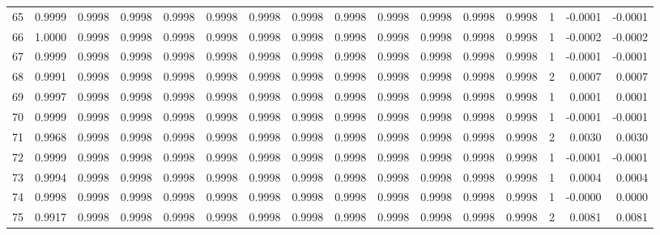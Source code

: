 \begin{tabular}{lrrrrrrrrrrrrrrr}
65  &      0.9999 &  0.9998 &  0.9998 &  0.9998 &  0.9998 &  0.9998 &  0.9998 &  0.9998 &  0.9998 &  0.9998 &   0.9998 &     0.9998 &      1 &                   -0.0001 &                    -0.0001 \\
66  &      1.0000 &  0.9998 &  0.9998 &  0.9998 &  0.9998 &  0.9998 &  0.9998 &  0.9998 &  0.9998 &  0.9998 &   0.9998 &     0.9998 &      1 &                   -0.0002 &                    -0.0002 \\
67  &      0.9999 &  0.9998 &  0.9998 &  0.9998 &  0.9998 &  0.9998 &  0.9998 &  0.9998 &  0.9998 &  0.9998 &   0.9998 &     0.9998 &      1 &                   -0.0001 &                    -0.0001 \\
68  &      0.9991 &  0.9998 &  0.9998 &  0.9998 &  0.9998 &  0.9998 &  0.9998 &  0.9998 &  0.9998 &  0.9998 &   0.9998 &     0.9998 &      2 &                    0.0007 &                     0.0007 \\
69  &      0.9997 &  0.9998 &  0.9998 &  0.9998 &  0.9998 &  0.9998 &  0.9998 &  0.9998 &  0.9998 &  0.9998 &   0.9998 &     0.9998 &      1 &                    0.0001 &                     0.0001 \\
70  &      0.9999 &  0.9998 &  0.9998 &  0.9998 &  0.9998 &  0.9998 &  0.9998 &  0.9998 &  0.9998 &  0.9998 &   0.9998 &     0.9998 &      1 &                   -0.0001 &                    -0.0001 \\
71  &      0.9968 &  0.9998 &  0.9998 &  0.9998 &  0.9998 &  0.9998 &  0.9998 &  0.9998 &  0.9998 &  0.9998 &   0.9998 &     0.9998 &      2 &                    0.0030 &                     0.0030 \\
72  &      0.9999 &  0.9998 &  0.9998 &  0.9998 &  0.9998 &  0.9998 &  0.9998 &  0.9998 &  0.9998 &  0.9998 &   0.9998 &     0.9998 &      1 &                   -0.0001 &                    -0.0001 \\
73  &      0.9994 &  0.9998 &  0.9998 &  0.9998 &  0.9998 &  0.9998 &  0.9998 &  0.9998 &  0.9998 &  0.9998 &   0.9998 &     0.9998 &      1 &                    0.0004 &                     0.0004 \\
74  &      0.9998 &  0.9998 &  0.9998 &  0.9998 &  0.9998 &  0.9998 &  0.9998 &  0.9998 &  0.9998 &  0.9998 &   0.9998 &     0.9998 &      1 &                   -0.0000 &                     0.0000 \\
75  &      0.9917 &  0.9998 &  0.9998 &  0.9998 &  0.9998 &  0.9998 &  0.9998 &  0.9998 &  0.9998 &  0.9998 &   0.9998 &     0.9998 &      2 &                    0.0081 &                     0.0081 \\

\end{tabular}
